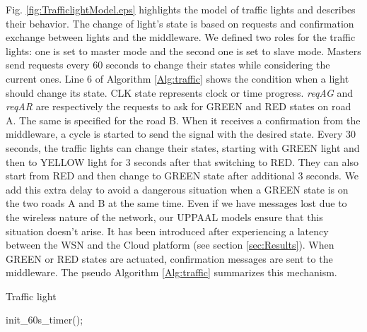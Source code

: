 \documentclass[conference]{../../setup/IEEEtran}
\begin{document}
Fig. \ref{fig:TrafficlightModel.eps} highlights the model of traffic lights and describes their behavior. The change of light's state is based on requests and confirmation exchange between lights and the middleware. We defined two roles for the traffic lights: one is set to master mode and the second one is set to slave mode.
Masters send requests every 60 seconds to change their states while considering the current ones. Line 6 of Algorithm \ref{Alg:traffic} shows the condition when a light should change its state. CLK state represents clock or time progress.  \emph{reqAG} and \emph{reqAR} are respectively the requests to ask for GREEN and RED states on road A. The same is specified for the road B.  
When it receives a confirmation from the middleware, a cycle is started to send the signal with the desired state. Every 30 seconds, the traffic lights can change their states, starting with GREEN light and then to YELLOW light for 3 seconds after that switching to RED. They can also start from RED and then change to GREEN state after additional 3 seconds. We add this extra delay to avoid a dangerous situation when a GREEN state is on the two roads A and B at the same time. Even if we have messages lost due to the wireless nature of the network, our UPPAAL models ensure that this situation doesn't arise. It has been introduced after experiencing a latency between the WSN and the Cloud platform (see section \ref{sec:Results}). When GREEN or RED states are actuated, confirmation messages are sent to the middleware. The pseudo Algorithm \ref{Alg:traffic} summarizes this mechanism.

\LinesNumbered \begin{algorithm}[ht] \caption{Traffic light\label{Alg:traffic}}
init\_60s\_timer();
\end{algorithm}

\end{document}
